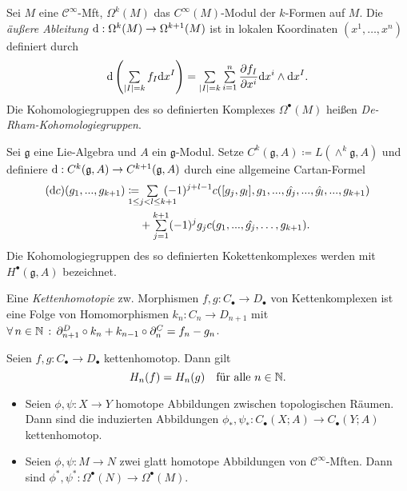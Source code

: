 \documentclass{cheat-sheet}
\newcommand{\nspace}[1]{\foreach \i in {1,...,#1}{ \! }} %
\newcommand{\CC}[1]{{#1}_{\bullet}} %
\newcommand{\Lg}{\mathfrak{g}} %
\newcommand{\Cont}{\mathcal{C}} %
\begin{document}

\begin{defn}
  Sei $M$ eine $\Cont^\infty$-Mft, $\Omega^k(M)$ das $C^\infty(M)$-Modul der $k$-Formen auf $M$. Die \emph{äußere Ableitung} $\mathrm{d} : \Omega^k(M) \to \Omega^{k+1}(M)$ ist in lokalen Koordinaten $(x^1, \ldots, x^n)$ definiert durch
  \[ \d \left( \sum_{\abs{I} = k} f_I \d x^I \right) = \sum_{\abs{I} = k} \sum_{i=1}^n \frac{\partial f_I}{\partial x^i} \d x^i \wedge \d x^I. \]
  Die Kohomologiegruppen des so definierten Komplexes $\Omega^\bullet(M)$ heißen \emph{De-Rham-Kohomologiegruppen}.
\end{defn}


\begin{defn}
  Sei $\Lg$ eine Lie-Algebra und $A$ ein $\Lg$-Modul. Setze $C^k(\Lg, A) \coloneqq L(\wedge^k \Lg, A)$ und definiere $\d : C^k(\Lg, A) \to C^{k+1}(\Lg, A)$ durch eine allgemeine Cartan-Formel
  \begin{align*}
    (\d c)(g_1, \nldots, g_{k+1}) \coloneqq & \nspace{7} \sum_{1 \leq j < l \leq k+1} \nspace{7} (-1)^{j+l-1} c([g_j, g_l], g_1, \nldots, \hat{g_j}, \nldots, \hat{g_l}, \nldots, g_{k+1}) \\
    & + \sum_{j=1}^{k+1} (-1)^j g_j c(g_1, \nldots, \hat{g_j}, \ldots, g_{k+1}).
  \end{align*}
  Die Kohomologiegruppen des so definierten Kokettenkomplexes werden mit $H^\bullet(\Lg, A)$ bezeichnet.
\end{defn}

\begin{defn}
  Eine \emph{Kettenhomotopie} zw. Morphismen $f, g : \CC{C} \to \CC{D}$ von Kettenkomplexen ist eine Folge von Homomorphismen $k_n : C_n \to D_{n+1}$ mit
  $\forall \, {n \in \mathbb{N}} \,:\, \partial^D_{n+1} \circ k_n + k_{n-1} \circ \partial^C_n = f_n - g_n$.
\end{defn}

\begin{lem}
  Seien $f, g : \CC{C} \to \CC{D}$ kettenhomotop. Dann gilt
  \[ H_n(f) = H_n(g) \quad \text{für alle $n \in \mathbb{N}$.} \]
\end{lem}

\begin{prop}
  \begin{itemize}
    \item Seien $\phi, \psi : X \to Y$ homotope Abbildungen zwischen topologischen Räumen. Dann sind die induzierten Abbildungen $\phi_*, \psi_* : \CC{C}(X; A) \to \CC{C}(Y; A)$ kettenhomotop.
    \item Seien $\phi, \psi : M \to N$ zwei glatt homotope Abbildungen von $\Cont^\infty$-Mften. Dann sind $\phi^*, \psi^* : \Omega^\bullet(N) \to \Omega^\bullet(M)$.
  \end{itemize}
\end{prop}
\end{document}
